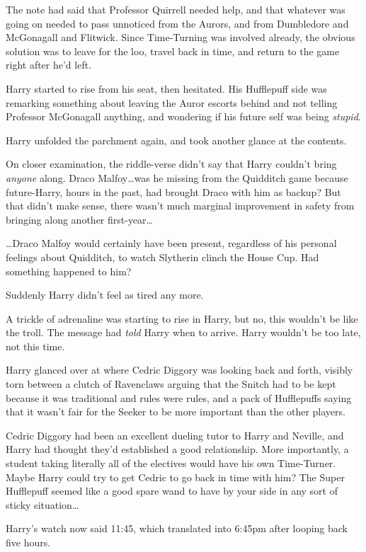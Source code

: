 The note had said that Professor Quirrell needed help, and that whatever was
going on needed to pass unnoticed from the Aurors, and from Dumbledore and
McGonagall and Flitwick. Since Time-Turning was involved already, the obvious
solution was to leave for the loo, travel back in time, and return to the game
right after he'd left.

Harry started to rise from his seat, then hesitated. His Hufflepuff side was
remarking something about leaving the Auror escorts behind and not telling
Professor McGonagall anything, and wondering if his future self was being
\emph{stupid}.

Harry unfolded the parchment again, and took another glance at the contents.

On closer examination, the riddle-verse didn't say that Harry couldn't bring
\emph{anyone} along. Draco Malfoy…was he missing from the Quidditch
game because future-Harry, hours in the past, had brought Draco with him as
backup? But that didn't make sense, there wasn't much marginal improvement in
safety from bringing along another first-year…

…Draco Malfoy would certainly have been present, regardless of his
personal feelings about Quidditch, to watch Slytherin clinch the House Cup. Had
something happened to him?

Suddenly Harry didn't feel as tired any more.

A trickle of adrenaline was starting to rise in Harry, but no, this wouldn't be
like the troll. The message had \emph{told} Harry when to arrive. Harry
wouldn't be too late, not this time.

Harry glanced over at where Cedric Diggory was looking back and forth, visibly
torn between a clutch of Ravenclaws arguing that the Snitch had to be kept
because it was traditional and rules were rules, and a pack of Hufflepuffs
saying that it wasn't fair for the Seeker to be more important than the other
players.

Cedric Diggory had been an excellent dueling tutor to Harry and Neville, and
Harry had thought they'd established a good relationship. More importantly, a
student taking literally all of the electives would have his own Time-Turner.
Maybe Harry could try to get Cedric to go back in time with him? The Super
Hufflepuff seemed like a good spare wand to have by your side in any sort of
sticky situation…

Harry's watch now said 11:45, which translated into 6:45pm after looping back
five hours.

